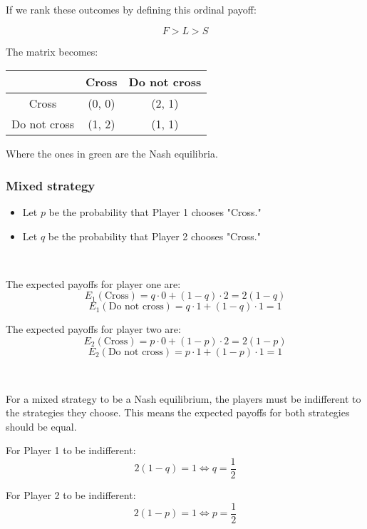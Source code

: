 \documentclass{article}
\begin{document}
If we rank these outcomes by defining this ordinal payoff:

\[ F > L > S \]

The matrix becomes:

\begin{center}
    \begin{tabular}{|c|c|c|}
        \hline
                        & Cross & Do not cross \\\hline
        Cross           & (0, 0) & \cellcolor{green!30}(2, 1) \\\hline
        Do not cross    & \cellcolor{green!30}(1, 2) & (1, 1) \\\hline
    \end{tabular}
\end{center}

Where the ones in green are the Nash equilibria.


\subsubsection*{Mixed strategy}

\begin{itemize}
    \item Let \( p \) be the probability that Player 1 chooses "Cross."
    \item Let \( q \) be the probability that Player 2 chooses "Cross."
\end{itemize}

\

The expected payoffs for player one are:
\[
E_1(\text{Cross}) = q \cdot 0 + (1 - q) \cdot 2 = 2(1 - q)
\]
\[
E_1(\text{Do not cross}) = q \cdot 1 + (1 - q) \cdot 1 = 1
\]

The expected payoffs for player two are:
\[
E_2(\text{Cross}) = p \cdot 0 + (1 - p) \cdot 2 = 2(1 - p)
\]
\[
E_2(\text{Do not cross}) = p \cdot 1 + (1 - p) \cdot 1 = 1
\]

\

\noindent For a mixed strategy to be a Nash equilibrium, the players must be indifferent to the strategies they choose. This means the expected payoffs for both strategies should be equal.

For Player 1 to be indifferent:
\[
2(1 - q) = 1 \iff q = \frac{1}{2}
\]

For Player 2 to be indifferent:
\[
2(1 - p) = 1 \iff p = \frac{1}{2}
\]
\end{document}

